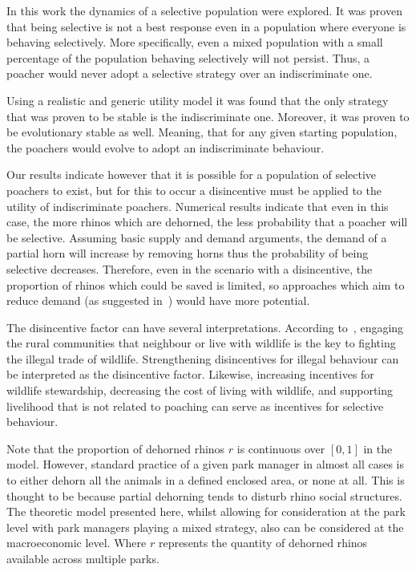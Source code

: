\documentclass[10pt]{article}
\begin{document}
In this work the dynamics of a selective population were explored. It was proven
that being selective is not a best response even in a population where
everyone is behaving selectively. More specifically, even a mixed population with
a small percentage of the population behaving selectively will not persist. Thus,
a poacher would never adopt a selective strategy over an indiscriminate one.

Using a realistic and generic utility model it was found that
the only strategy that was proven to be stable is the indiscriminate one.
Moreover, it was proven to be evolutionary stable as well. Meaning,
that for any given starting population, the poachers would evolve to adopt an
indiscriminate behaviour.

Our results indicate however that it is possible for a population of selective
poachers to exist, but for this to occur a disincentive must be applied to the
utility of indiscriminate poachers. Numerical results indicate that even in this
case, the more rhinos which are dehorned, the less probability that a poacher
will be selective. Assuming basic supply and demand arguments, the demand of
a partial horn will increase by removing horns thus the probability
of being selective decreases. Therefore, even in the scenario with a
disincentive, the proportion of rhinos which could be saved is limited, so
approaches which aim to reduce demand (as suggested in~\cite{Duan2013})
would have more potential.

The disincentive factor can have several interpretations. According to~\cite{Duan2017},
engaging the rural communities that neighbour or live with wildlife is the
key to fighting the illegal trade of wildlife. Strengthening disincentives for
illegal behaviour can be interpreted as the disincentive factor. Likewise,
increasing incentives for wildlife stewardship, decreasing the cost of living
with wildlife, and supporting livelihood that is not related to poaching can
serve as incentives for selective behaviour.

Note that the proportion of dehorned rhinos \(r\) is continuous over \([0, 1]\)
in the model. However, standard practice of a given park manager in almost all
cases is to either dehorn all the animals in a defined enclosed area, or none
at all. This is thought to be because partial dehorning tends to disturb
rhino social structures. The theoretic model presented here, whilst allowing for
consideration at the park level with park managers playing a mixed strategy, also
can be considered at the macroeconomic level. Where \(r\) represents the quantity
of dehorned rhinos available across multiple parks.
\end{document}
